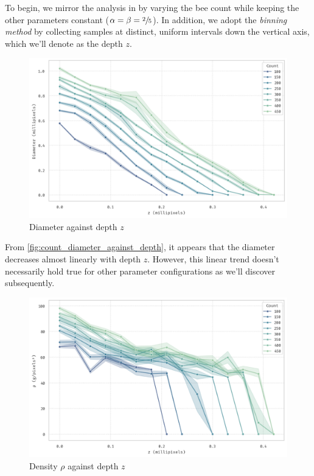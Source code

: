 \documentclass[a4paper,10pt]{article}
\begin{document}
\begin{multicols}{2}
    To begin, we mirror the analysis in \cite{shishkov2022strength} by varying the bee count while
    keeping the other parameters constant ($\alpha = \beta = \sfrac{2}{5}$). In addition, we
    adopt the \textit{binning method} by collecting samples at distinct, uniform intervals down
    the vertical axis, which we'll denote as the depth $z$.

    \begin{figure}[H]
        \centering
        \includegraphics[width=\linewidth]{bee_count_diameter.pdf}
        \caption{Diameter against depth $z$}
        \label{fig:count_diameter_against_depth}
    \end{figure}

    From \autoref{fig:count_diameter_against_depth}, it appears that the diameter decreases almost
    linearly with depth $z$. However, this linear trend doesn't necessarily hold true for
    other parameter configurations as we'll discover subsequently.

    \begin{figure}[H]
        \centering
        \includegraphics[width=\linewidth]{bee_count_density.pdf}
        \caption{Density $\rho$ against depth $z$}
        \label{fig:count_density_against_depth}
    \end{figure}


\end{multicols}
\end{document}
